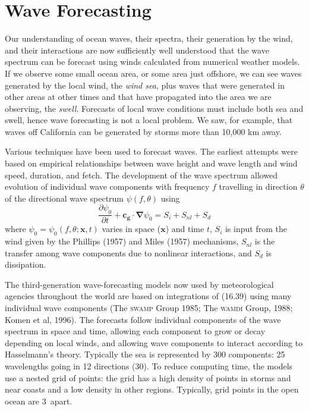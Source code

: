 \section{Wave Forecasting}
Our understanding of ocean waves, their
spectra, their generation by the wind, and their interactions are now
sufficiently well understood that the wave spectrum can be forecast
using winds calculated from numerical weather models. If we observe
some small ocean area, or some area just offshore, we can see waves
generated by the local wind, the \textit{wind sea}, plus waves that were generated in other areas at other
times and that have propagated into the area we are observing, the
\textit{swell}.  Forecasts of local wave conditions must include both
sea and swell, hence wave forecasting is not a local problem. We saw,
for example, that waves off California can be generated by storms more
than 10,000 km away.

Various techniques have been used to forecast waves. The earliest
attempts were based on empirical relationships between wave height and
wave length and wind speed, duration, and fetch. The development of
the wave spectrum allowed evolution of individual wave components with
frequency $f$ travelling in direction $\theta $ of the directional
wave spectrum $\psi (f, \theta )$ using
\begin{equation}
\frac{\partial \psi_0 }{\partial t} + \mathbf{c_g \cdot \nabla }\psi_0 = S_{i}
+ S_{nl} + S_{d}
\end{equation}
where $\psi_0 = \psi _0 (f, \theta ; \mathbf{x},t)$ varies in space
($\mathbf x$) and time $t$, $S_{i}$ is input from the wind given by
the Phillips (1957) and Miles (1957) mechanisms, $S_{nl}$ is the
transfer among wave components due to nonlinear interactions, and
$S_{d}$ is dissipation.

The third-generation wave-forecasting models now used by
meteorological agencies throughout the world are based on integrations
of (16.39) using many individual wave components (The \textsc{swamp}
Group 1985; The \textsc{wamdi} Group, 1988; Komen et al, 1996). The
forecasts follow individual components of the wave spectrum in space
and time, allowing each component to grow or decay depending on local
winds, and allowing wave components to interact according to
Hasselmann's theory. Typically the sea is represented by 300
components: 25 wavelengths going in 12 directions (30\degrees ). To
reduce computing time, the models use a nested grid of points: the
grid has a high density of points in storms and near coasts and a low
density in other regions. Typically, grid points in the open ocean are
3\degrees\ apart.

